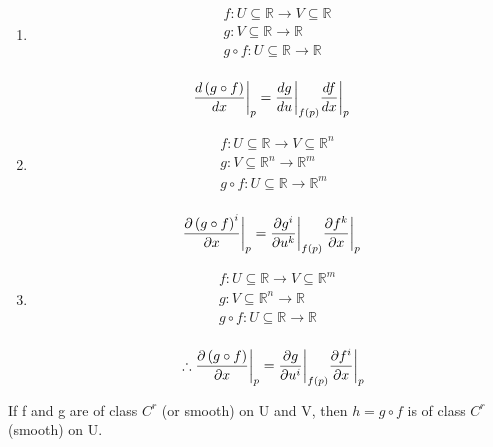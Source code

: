 \begin{enumerate}
    \item
    \begin{align*}
        & f: U \subseteq \mathbb{R} \longrightarrow V \subseteq \mathbb{R} \\
        & g: V \subseteq \mathbb{R} \longrightarrow \mathbb{R} \\
        & g \circ f : U \subseteq \mathbb{R} \longrightarrow \mathbb{R} \\
    \end{align*}

    \begin{align*}
        & \frac{d \left(  g \circ f \right)}{d x} \bigg|_p = \frac{d g}{d u} \bigg|_{f(p)} \frac{d f}{d x} \bigg|_p \\
    \end{align*}

    \item
    \begin{align*}
        & f: U \subseteq \mathbb{R} \longrightarrow V \subseteq \mathbb{R}^n \\
        & g: V \subseteq \mathbb{R}^n \longrightarrow \mathbb{R}^m \\
        & g \circ f : U \subseteq \mathbb{R} \longrightarrow \mathbb{R}^m \\
    \end{align*}

    \begin{align*}
        & \frac{\partial \left(  g \circ f \right)^i}{\partial x} \bigg|_p = \frac{\partial g^i}{\partial u^k} \bigg|_{f(p)} \frac{\partial f^k}{\partial x} \bigg|_p \\
    \end{align*}

    \item
    \begin{align*}
        & f: U \subseteq \mathbb{R} \longrightarrow V \subseteq \mathbb{R}^m \\
        & g: V \subseteq \mathbb{R}^n \longrightarrow \mathbb{R} \\
        & g \circ f : U \subseteq \mathbb{R} \longrightarrow \mathbb{R} \\
    \end{align*}

    \begin{align*}
        & \therefore \frac{\partial \left(  g \circ f \right)}{\partial x} \bigg|_p = \frac{\partial g}{\partial u^i} \bigg|_{f(p)} \frac{\partial f^i}{\partial x} \bigg|_p \\
    \end{align*}
\end{enumerate}

If f and g are of class $ C^r$ (or smooth) on U and V, then $ h = g \circ f$ is of class $ C^r$ (smooth) on U.